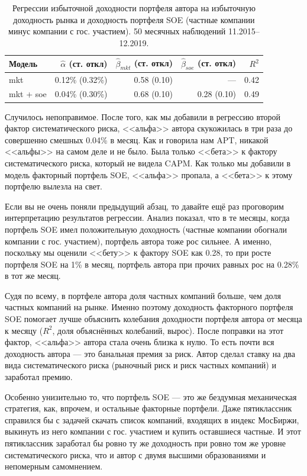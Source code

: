 \begin{table}[h!]
\centering
\begin{tabular}{l|r|r|r|r}
Модель &
$\hat{\alpha}$ (ст. откл) &
$\hat{\beta}_{mkt}$ (ст. откл) &
$\hat{\beta}_{soe}$ (ст. откл) &
$R^2$ \\ \hline
mkt       & 0.12\% (0.32\%) & 0.58 (0.10) & ---         & 0.42 \\
mkt + soe & 0.04\% (0.30\%) & 0.68 (0.10) & 0.28 (0.10) & 0.49
\end{tabular}
\caption{Регрессии избыточной доходности портфеля автора на избыточную доходность рынка и доходность портфеля SOE (частные компании минус компании с гос. участием). 50 месячных наблюдений 11.2015--12.2019.}
\label{two_factor_regression_results}
\end{table}

Случилось непоправимое. После того, как мы добавили в регрессию второй фактор систематического риска, <<альфа>> автора скукожилась в три раза до совершенно смешных 0.04\% в месяц. Как и говорила нам APT, никакой <<альфы>> на самом деле и не было. Была только <<бета>> к фактору систематического риска, который не видела CAPM. Как только мы добавили в модель факторный портфель SOE, <<альфа>> пропала, а <<бета>> к этому портфелю вылезла на свет.

Если вы не очень поняли предыдущий абзац, то давайте ещё раз проговорим интерпретацию результатов регрессии. Анализ показал, что в те месяцы, когда портфель SOE имел положительную доходность (частные компании обогнали компании с гос. участием), портфель автора тоже рос сильнее. А именно, поскольку мы оценили <<бету>> к фактору SOE как 0.28, то при росте портфеля SOE на 1\% в месяц, портфель автора при прочих равных рос на 0.28\% в тот же месяц.

Судя по всему, в портфеле автора доля частных компаний больше, чем доля частных компаний на рынке. Именно поэтому доходность факторного портфеля SOE помогает лучше объяснить колебания доходности портфеля автора от месяца к месяцу ($R^2$, доля объяснённых колебаний, вырос). После поправки на этот фактор, <<альфа>> автора стала очень близка к нулю. То есть почти вся доходность автора --- это банальная премия за риск. Автор сделал ставку на два вида систематического риска (рыночный риск и риск частных компаний) и заработал премию.

Особенно унизительно то, что портфель SOE --- это же бездумная механическая стратегия, как, впрочем, и остальные факторные портфели. Даже пятиклассник справился бы с задачей скачать список компаний, входящих в индекс МосБиржи, выкинуть из него компании с гос. участием и купить оставшиеся частные. И этот пятиклассник заработал бы ровно ту же доходность при ровно том же уровне систематического риска, что и автор с двумя высшими образованиями и непомерным самомнением.

